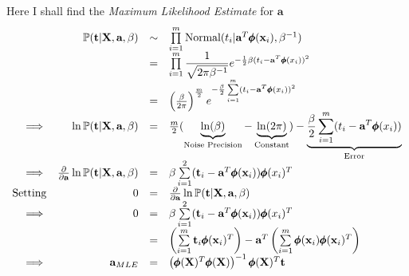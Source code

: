 \documentclass[11pt,a4paper]{article}
\begin{document}
Here I shall find the \textit{Maximum Likelihood Estimate} for $\textbf{a}$
\[\begin{array}{rrcl}
&\mathbb{P}(\textbf{t}|\textbf{X},\textbf{a},\beta)&\sim&\prod\limits_{i=1}^m\text{Normal}(t_i|\textbf{a}^T\pmb{\phi}(\textbf{x}_i),\beta^{-1})\\
&&=&\prod\limits_{i=1}^m\dfrac{1}{\sqrt{2\pi\beta^{-1}}}e^{-\frac{1}{2}\beta(t_i-\textbf{a}^T\pmb{\phi}(x_i))^2}\\
&&=&\left(\frac{\beta}{2\pi}\right)^{\frac{m}{2}}e^{-\frac{\beta}{2}\sum\limits_{i=1}^m(t_i-\textbf{a}^T\pmb{\phi}(x_i))^2}\\
\implies&\ln\mathbb{P}(\textbf{t}|\textbf{X},\textbf{a},\beta)&=&\frac{m}{2}(\underbrace{\ln(\beta)}_{\text{Noise Precision}}-\underbrace{\ln(2\pi)}_{\text{Constant}})-\underbrace{\frac{\beta}{2}\sum\limits_{i=1}^m(t_i-\textbf{a}^T\pmb{\phi}(x_i))}_{\text{Error}}\\
\implies&\frac{\partial}{\partial\textbf{a}}\ln\mathbb{P}(\textbf{t}|\textbf{X},\textbf{a},\beta)&=&\beta\sum\limits_{i=1}^2(\textbf{t}_i-\textbf{a}^T\pmb{\phi}(\textbf{x}_i))\pmb{\phi}(x_i)^T\\
\text{Setting}&0&=&\frac{\partial}{\partial\textbf{a}}\ln\mathbb{P}(\textbf{t}|\textbf{X},\textbf{a},\beta)\\
\implies&0&=&\beta\sum\limits_{i=1}^2(\textbf{t}_i-\textbf{a}^T\pmb{\phi}(\textbf{x}_i))\pmb{\phi}(x_i)^T\\
&&=&\left(\sum\limits_{i=1}^m\textbf{t}_i\pmb{\phi}(\textbf{x}_i)^T\right)-\textbf{a}^T\left(\sum\limits_{i=1}^m\pmb{\phi}(\textbf{x}_i)\pmb{\phi}(\textbf{x}_i)^T\right)\\
\implies&\textbf{a}_{MLE}&=&\left(\pmb{\phi}(\textbf{X})^T\pmb{\phi}(\textbf{X})\right)^{-1}\pmb{\phi}(\textbf{X})^T\textbf{t}
\end{array}\]
\end{document}
